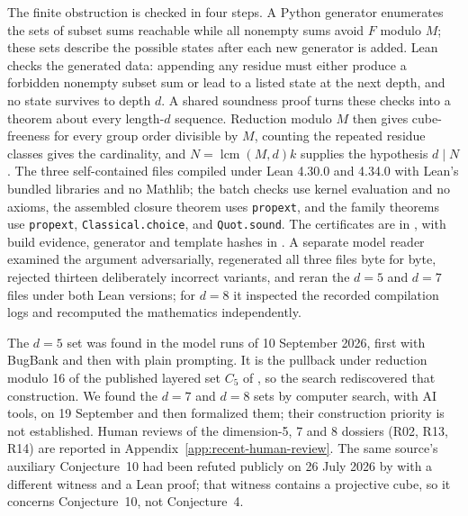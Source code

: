 The finite obstruction is checked in four steps. A Python generator enumerates the sets of subset sums reachable while all nonempty sums avoid $F$ modulo $M$; these sets describe the possible states after each new generator is added. Lean checks the generated data: appending any residue must either produce a forbidden nonempty subset sum or lead to a listed state at the next depth, and no state survives to depth $d$. A shared soundness proof turns these checks into a theorem about every length-$d$ sequence. Reduction modulo $M$ then gives cube-freeness for every group order divisible by $M$, counting the repeated residue classes gives the cardinality, and $N=\operatorname{lcm}(M,d)k$ supplies the hypothesis $d\mid N$. The three self-contained files compiled under Lean 4.30.0 and 4.34.0 with Lean's bundled libraries and no Mathlib; the batch checks use kernel evaluation and no axioms, the assembled closure theorem uses \texttt{propext}, and the family theorems use \texttt{propext}, \texttt{Classical.choice}, and \texttt{Quot.sound}. The certificates are in , with build evidence, generator and template hashes in . A separate model reader examined the argument adversarially, regenerated all three files byte for byte, rejected thirteen deliberately incorrect variants, and reran the $d=5$ and $d=7$ files under both Lean versions; for $d=8$ it inspected the recorded compilation logs and recomputed the mathematics independently.

The $d=5$ set was found in the model runs of 10 September 2026, first with BugBank and then with plain prompting. It is the pullback under reduction modulo 16 of the published layered set $C_5$ of \citet{long2019projective}, so the search rediscovered that construction. We found the $d=7$ and $d=8$ sets by computer search, with AI tools, on 19 September and then formalized them; their construction priority is not established. Human reviews of the dimension-5, 7 and 8 dossiers (R02, R13, R14) are reported in Appendix~\ref{app:recent-human-review}. The same source's auxiliary Conjecture~10 had been refuted publicly on 26 July 2026 by \citet{hypnopump2026conj10} with a different witness and a Lean proof; that witness contains a projective cube, so it concerns Conjecture~10, not Conjecture~4.

